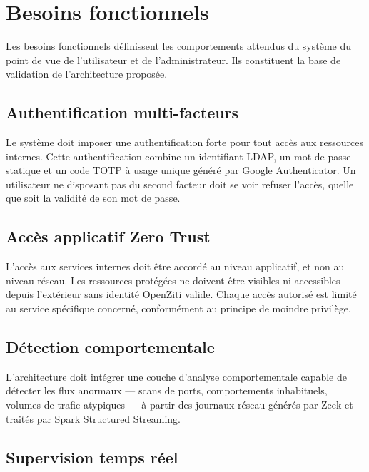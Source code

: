\documentclass[12pt,a4paper,oneside]{report}
\begin{document}
	\section{Besoins fonctionnels}
	
	Les besoins fonctionnels définissent les comportements attendus du système
	du point de vue de l'utilisateur et de l'administrateur. Ils constituent
	la base de validation de l'architecture proposée.
	
	\subsection{Authentification multi-facteurs}
	
	Le système doit imposer une authentification forte pour tout accès aux
	ressources internes. Cette authentification combine un identifiant LDAP,
	un mot de passe statique et un code TOTP à usage unique généré par Google
	Authenticator. Un utilisateur ne disposant pas du second facteur doit se
	voir refuser l'accès, quelle que soit la validité de son mot de passe.
	
	\subsection{Accès applicatif Zero Trust}
	
	L'accès aux services internes doit être accordé au niveau applicatif,
	et non au niveau réseau. Les ressources protégées ne doivent être visibles
	ni accessibles depuis l'extérieur sans identité OpenZiti valide. Chaque
	accès autorisé est limité au service spécifique concerné, conformément
	au principe de moindre privilège.
	
	\subsection{Détection comportementale}
	
	L'architecture doit intégrer une couche d'analyse comportementale capable
	de détecter les flux anormaux --- scans de ports, comportements inhabituels,
	volumes de trafic atypiques --- à partir des journaux réseau générés par Zeek
	et traités par Spark Structured Streaming.
	
	\subsection{Supervision temps réel}
	
\end{document}
